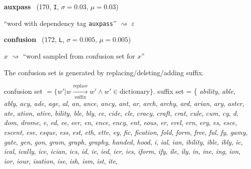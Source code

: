 \documentclass[11pt]{article}
\newenvironment{desc}{%
	\list{}{%
		\parsep 0.25em
		\topsep 0.25em
		\leftmargin 1em
		\rightmargin 0em
	}
	\item\relax
	\sloppy
}{%
	\endlist
}
\newcommand{\attr}[4]{%
	(#1, \texttt{#2}, $\sigma=#3$, $\mu=#4$)
}
\begin{document}
\noindent
\textbf{auxpass}~\attr{170}{I}{0.03}{0.03}

\begin{desc}
	``word with dependency tag \texttt{auxpass}''
	$\rightsquigarrow$
	\textit{$\varepsilon$}
\end{desc}

\noindent
\textbf{confusion}~\attr{172}{L}{0.005}{0.005}

\begin{desc}
	$x$ $\rightsquigarrow$ ``word sampled from confusion set for $x$''

	The confusion set is generated by replacing/deleting/adding suffix.

confusion set $= \{w' | w \xrightarrow[\text{suffix}]{\text{replace}} w' \land w' \in \text{dictionary}\}$.
suffix set = \{
		\textit{ability},
		\textit{able},
		\textit{ably},
		\textit{acy},
		\textit{ade},
		\textit{age},
		\textit{al},
		\textit{an},
		\textit{ance},
		\textit{ancy},
		\textit{ant},
		\textit{ar},
		\textit{arch},
		\textit{archy},
		\textit{ard},
		\textit{arian},
		\textit{ary},
		\textit{aster},
		\textit{ate},
		\textit{ation},
		\textit{ative},
		\textit{bility},
		\textit{ble},
		\textit{bly},
		\textit{ce},
		\textit{cide},
		\textit{cle},
		\textit{cracy},
		\textit{craft},
		\textit{crat},
		\textit{cule},
		\textit{cum},
		\textit{cy},
		\textit{d},
		\textit{dom},
		\textit{drome},
		\textit{e},
		\textit{ed},
		\textit{ee},
		\textit{eer},
		\textit{en},
		\textit{ence},
		\textit{ency},
		\textit{ent},
		\textit{eous},
		\textit{er},
		\textit{erel},
		\textit{ern},
		\textit{ery},
		\textit{es},
		\textit{esce},
		\textit{escent},
		\textit{ese},
		\textit{esque},
		\textit{ess},
		\textit{est},
		\textit{eth},
		\textit{ette},
		\textit{ey},
		\textit{fic},
		\textit{fication},
		\textit{fold},
		\textit{form},
		\textit{free},
		\textit{ful},
		\textit{fy},
		\textit{gamy},
		\textit{gate},
		\textit{gen},
		\textit{gon},
		\textit{gram},
		\textit{graph},
		\textit{graphy},
		\textit{handed},
		\textit{hood},
		\textit{i},
		\textit{ial},
		\textit{ian},
		\textit{ibility},
		\textit{ible},
		\textit{ibly},
		\textit{ic},
		\textit{ical},
		\textit{ically},
		\textit{ice},
		\textit{ician},
		\textit{ics},
		\textit{id},
		\textit{ie},
		\textit{ied},
		\textit{ier},
		\textit{ies},
		\textit{iform},
		\textit{ify},
		\textit{ile},
		\textit{ily},
		\textit{in},
		\textit{ine},
		\textit{ing},
		\textit{ion},
		\textit{ior},
		\textit{iour},
		\textit{isation},
		\textit{ise},
		\textit{ish},
		\textit{ism},
		\textit{ist},
		\textit{ite},

\end{desc}
\end{document}
